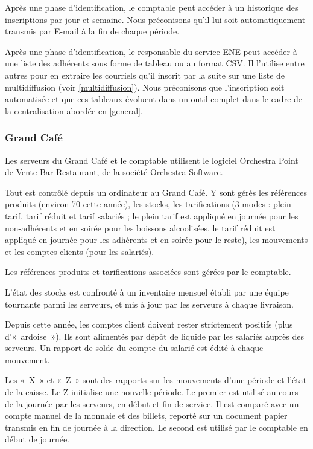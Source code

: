 Après une phase d'identification, le comptable peut accéder à un historique des inscriptions
par jour et semaine. Nous préconisons qu'il lui soit automatiquement transmis par E-mail
à la fin de chaque période.

Après une phase d'identification, le responsable du service ENE peut accéder à une liste
des adhérents sous forme de tableau ou au format CSV. Il l'utilise entre autres pour en
extraire les courriels qu'il inscrit par la suite sur une liste de multidiffusion (voir \ref{multidiffusion}). Nous préconisons que l'inscription soit automatisée et que ces
tableaux évoluent dans un outil complet dans le cadre de la centralisation abordée en \ref{general}.

\subsubsection{Grand Café}

Les serveurs du Grand Café et le comptable utilisent le logiciel Orchestra
Point de Vente Bar-Restaurant, de la société Orchestra Software.

Tout est contrôlé depuis un ordinateur au Grand Café. Y sont gérés les
références produits (environ 70 cette année), les stocks, les tarifications
(3 modes : plein tarif, tarif réduit et tarif salariés ; le plein tarif
est appliqué en journée pour les non-adhérents et en soirée pour les boissons
alcoolisées, le tarif réduit est appliqué en journée pour les adhérents
et en soirée pour le reste), les mouvements et les comptes clients (pour les
salariés).

Les références produits et tarifications associées sont gérées par le comptable.

L'état des stocks est confronté à un inventaire mensuel établi par une équipe
tournante parmi les serveurs, et mis à jour par les serveurs à chaque
livraison.

Depuis cette année, les comptes client doivent rester strictement positifs
(plus d'«~ardoise~»).
Ils sont alimentés par dépôt de liquide par les salariés auprès des serveurs.
Un rapport de solde du compte du salarié est édité à chaque mouvement.

Les «~X~» et «~Z~» sont des rapports sur les mouvements d'une période et
l'état de la caisse. Le Z initialise une nouvelle période.
Le premier est utilisé au cours de la journée par les serveurs, en début et fin
de service. Il est comparé avec un compte manuel de la monnaie et des billets,
reporté sur un document papier transmis en fin de journée à la direction.
Le second est utilisé par le comptable en début de journée.


